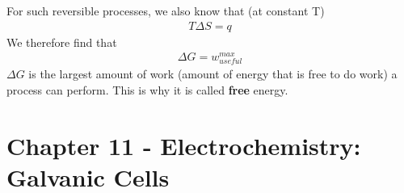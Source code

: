 \documentclass{article}  %
\begin{document}
For such reversible processes, we also know that (at constant T)
    \begin{equation*}
        \begin{aligned}
            T \Delta S = q
        \end{aligned}
    \end{equation*}
We therefore find that 
    \begin{equation*}
        \begin{aligned}
            \Delta G = w^{max}_{useful}
        \end{aligned}
    \end{equation*}
$\Delta G$ is the largest amount of work (amount of energy that is free to do work) a process can perform. This is why it is called \textbf{free} energy.

\section*{Chapter 11 - Electrochemistry: Galvanic Cells}
\end{document}
